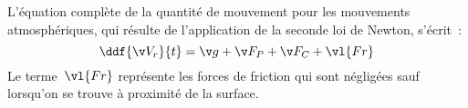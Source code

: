 \sk
L'équation complète de la quantité de mouvement pour les mouvements atmosphériques, qui résulte de l'application de la seconde loi de Newton, s'écrit~:
\[   
\ddf{\v V_r}{t} = \v g + \v F_P + \v F_C + \vl{Fr}
\] %
Le terme~$\vl{Fr}$ représente les forces de friction qui sont négligées sauf lorsqu'on se trouve à proximité de la surface.
